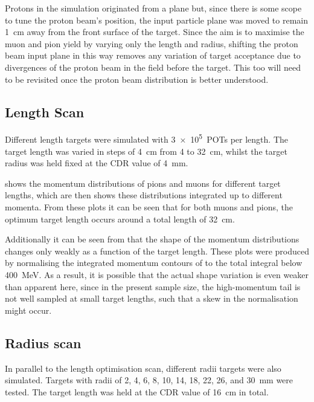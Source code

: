 Protons in the simulation originated from a plane but, since there is some scope to tune the proton
beam's position, the input particle plane was moved to remain 1~cm away from
the front surface of the target.  Since the aim is to maximise the muon and
pion yield by varying only the length and radius, shifting the proton beam
input plane in this way removes any variation of target acceptance due to
divergences of the proton beam in the field before the target.
This too will need to be revisited once the proton beam distribution is better understood.

\subsection{Length Scan}
Different length targets were simulated with \num{3e5}~\acp{POT} per length.
The target length was varied in steps of 4~cm from 4 to 32~cm, whilst the target radius was held fixed at the CDR value of 4~mm.

 shows the momentum distributions of pions and muons for different target lengths, which are 
 then shows these distributions integrated up to different momenta.
From these plots it can be seen that for both muons and pions, the optimum target length occurs around a total length of 32~cm.

Additionally it can be seen from
 that the shape of the
momentum distributions changes only weakly as a function of the target length.
These plots were produced by normalising the integrated momentum contours of
 to the total integral below
400~MeV.  As a result, it is possible that the actual shape variation is even
weaker than apparent here, since in the present sample size, the high-momentum
tail is not well sampled at small target lengths, such that a skew in the
normalisation might occur.

\FigOptimProdTgtLength
\FigOptimProdTgtRad
\subsection{Radius scan}
In parallel to the length optimisation scan, different radii targets were also simulated.
Targets with radii of 2, 4, 6, 8, 10, 14, 18, 22, 26, and 30~mm were tested.
The target length was held at the \ac{CDR} value of 16~cm in total.

